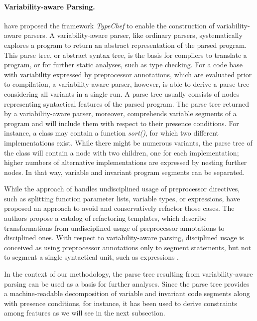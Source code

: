 \paragraph{Variability-aware Parsing.} \cite{kastner_variability-aware_2011}
have proposed the framework \emph{TypeChef} to enable the construction of
variability-aware parsers. A variability-aware parser, like ordinary parsers,
systematically explores a program to return an abstract representation of the
parsed program. This parse tree, or abstract syntax tree,
is the basis for compilers to translate a program, or for further static
analyses, such as type checking. For a code base with variability expressed by
preprocessor annotations, which are evaluated prior to compilation, a
variability-aware parser, however, is able to derive a parse tree considering
all variants in a single run. A parse tree usually consists of nodes
representing syntactical features of the parsed program. The parse tree
returned by a variability-aware parser, moreover, comprehends variable segments
of a program and will include them with respect to their presence conditions.
For instance, a class may contain a function \textit{sort()}, for which two
different implementations exist. While there might be numerous variants, the parse tree
of the class will contain a node with two children, one for each
implementation; higher numbers of alternative implementations are expressed by
nesting further nodes. In that way, variable and invariant program segments
can be separated.

While the approach of \cite{kastner_variability-aware_2011} handles
undisciplined usage of preprocessor directives, such as splitting function parameter lists, variable types, or
expressions, \cite{medeiros_discipline_2017} have proposed an approach to avoid and
conservatively refactor those cases. The authors propose a catalog of
refactoring templates, which describe transformations from undisciplined usage
of preprocessor annotations to disciplined ones. With respect to
variability-aware parsing, disciplined usage is conceived as using preprocessor
annotations only to segment statements, but not to segment a single syntactical
unit, such as expressions \citep{medeiros_discipline_2017}.

In the context of our methodology, the parse tree resulting from
variability-aware parsing can be used as a basis for further analyses. Since
the parse tree provides a machine-readable decomposition of variable and
invariant code segments along with presence conditions, for instance, it has
been used to derive constraints among features
\citep{nadi_mining_2014,nadi_where_2015} as we will see in the next subsection.


